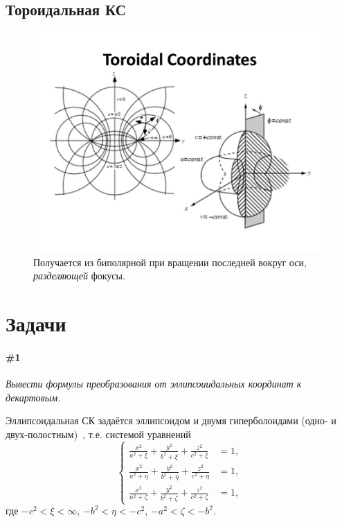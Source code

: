 \documentclass[12pt]{report}
\begin{document}
 \subsection{Тороидальная КС}
\begin{figure}[h]\centering
	\includegraphics[width=\linewidth]{toroidal_cs}
	\caption{Получается из биполярной при вращении последней вокруг оси, \emph{разделяющей} фокусы.}
\end{figure}

\section{Задачи}
\paragraph{\#1}
\emph{Вывести формулы преобразования от эллипсоиидальных координат к декартовым.}

Эллипсоидальная СК задаётся эллипсоидом и двумя гиперболоидами (одно- и двух-полостным)~\cite{Ellipsoidal-cs},
т.е. системой уравнений
\begin{equation*}
\begin{cases}
	\frac{x^2}{a^2 + \xi} + \frac{y^2}{b^2 + \xi} + \frac{z^2}{c^2 + \xi} &= 1,\\
	\frac{x^2}{a^2 + \eta} + \frac{y^2}{b^2 + \eta} + \frac{z^2}{c^2 + \eta} &= 1,\\
	\frac{x^2}{a^2 + \zeta} + \frac{y^2}{b^2 + \zeta} + \frac{z^2}{c^2 + \zeta} &= 1,
\end{cases}
\end{equation*}
где $-c^2 < \xi < \infty$, $-b^2 < \eta < -c^2$, $-a^2 < \zeta < -b^2$.
\end{document}
